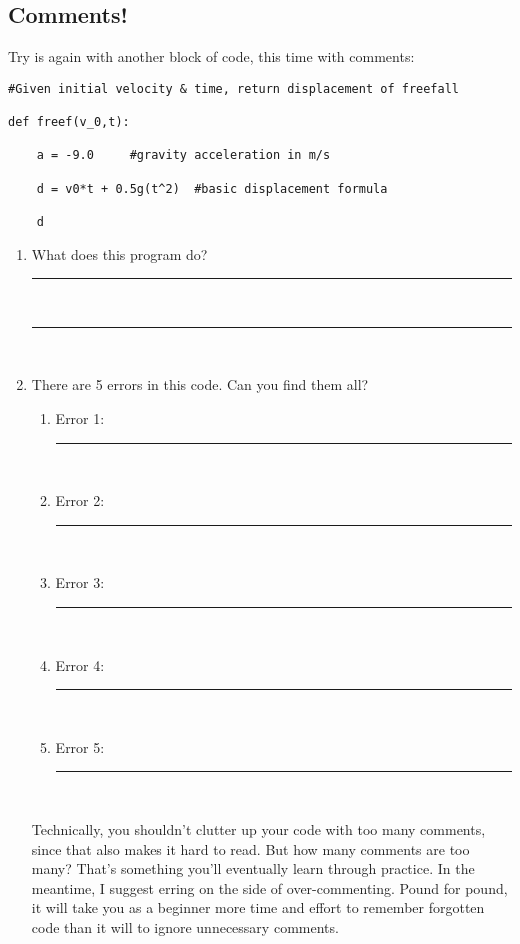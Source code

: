 \documentclass[paper=a4, fontsize=11pt]{scrartcl} %
\numberwithin{equation}{section} %
\numberwithin{figure}{section} %
\numberwithin{table}{section} %
\begin{document}
\subsection{Comments!}

     Try is again with another block of code, this time with comments:
     
\begin{framed}
\begin{lstlisting}
#Given initial velocity & time, return displacement of freefall

def freef(v_0,t):

    a = -9.0     #gravity acceleration in m/s

    d = v0*t + 0.5g(t^2)  #basic displacement formula

    d
\end{lstlisting}
\end{framed}

\begin{enumerate}

\item What does this program do? \rule{9cm}{0.15mm}\\

\rule{13.5cm}{0.15mm}\\

\item There are 5 errors in this code.  Can you find them all?\\

\begin{enumerate}

\item Error 1:\rule{11cm}{0.15mm}\\

\item Error 2:\rule{11cm}{0.15mm}\\

\item Error 3:\rule{11cm}{0.15mm}\\

\item Error 4:\rule{11cm}{0.15mm}\\

\item Error 5:\rule{11cm}{0.15mm}\\

\end{enumerate}

Technically, you shouldn't clutter up your code with too many comments, since that also makes it hard to read.  But how many comments are too many?  That's something you'll eventually learn through practice.  In the meantime, I suggest erring on the side of over-commenting.  Pound for pound, it will take you as a beginner more time and effort to remember forgotten code than it will to ignore unnecessary comments.


\end{enumerate}
\end{document}
